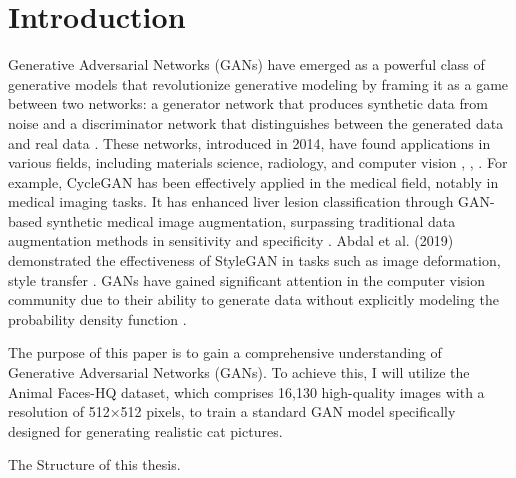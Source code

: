 \chapter{Introduction}

Generative Adversarial Networks (GANs) have emerged as a powerful class of generative models that revolutionize 
generative modeling by framing it as a game between two networks: a generator network that produces synthetic data 
from noise and a discriminator network that distinguishes between the generated data and real data \citep{10.48550/arxiv.1704.00028}. 
These networks, introduced in 2014, have found applications in various fields, including materials science, 
radiology, and computer vision \citep{10.1002/mgea.30}, \citep{10.1016/j.media.2019.101552}, \citep{10.1016/j.artmed.2020.101938}. 
For example, CycleGAN has been effectively applied in the medical field, notably in medical imaging tasks. 
It has enhanced liver lesion classification through GAN-based synthetic medical image augmentation, surpassing traditional data 
augmentation methods in sensitivity and specificity \citep{10.1016/j.neucom.2018.09.013}. 
Abdal et al. (2019) demonstrated the effectiveness of StyleGAN in tasks such as image deformation, style transfer \citep{10.1109/iccv.2019.00453}. 
GANs have gained significant attention in the computer vision community due to their ability to generate data without explicitly 
modeling the probability density function \citep{10.1016/j.media.2019.101552}.

The purpose of this paper is to gain a comprehensive understanding of Generative Adversarial Networks (GANs).
To achieve this, I will utilize the Animal Faces-HQ dataset, which comprises 16,130 high-quality images with a 
resolution of 512×512 pixels, to train a standard GAN model specifically designed for generating realistic cat pictures.

The Structure of this thesis.

